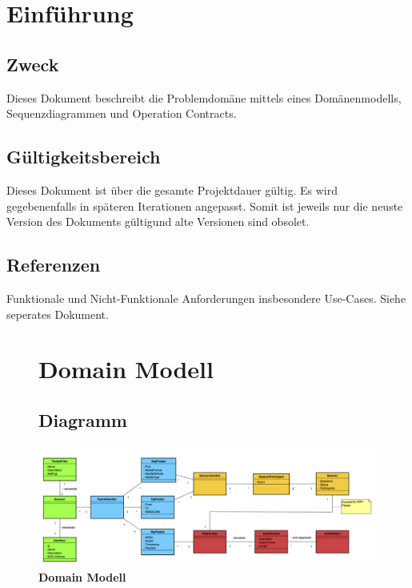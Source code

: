 \documentclass[a4,12pt]{scrartcl}
\begin{document}
\section{Einführung}
\subsection{Zweck}
Dieses Dokument beschreibt die Problemdomäne mittels eines Domänenmodells, Sequenzdiagrammen und Operation Contracts.
\subsection{Gültigkeitsbereich}
Dieses Dokument ist über die gesamte Projektdauer gültig. Es wird gegebenenfalls in späteren Iterationen angepasst. Somit ist jeweils nur die neuste Version des Dokuments gültigund alte Versionen sind obsolet.
\subsection{Referenzen}
\begin{description}
  Funktionale und Nicht-Funktionale Anforderungen insbesondere Use-Cases. Siehe seperates Dokument.
\end{description}
\newpage


\begin{landscape}
\begin{figure}[htbp]
\section{Domain Modell}
\subsection{Diagramm}
\centering
\includegraphics[width=\linewidth, height=\textheight,keepaspectratio]{./figures/DomainModel.png}
\caption{\textbf{Domain Modell}}
\end{figure}
\end{landscape}	
\end{document}

